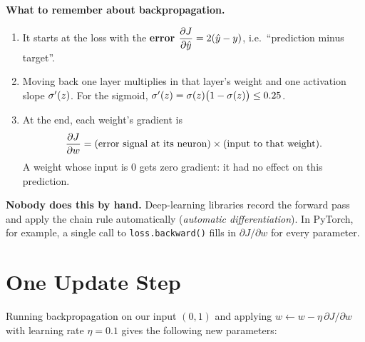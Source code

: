 \documentclass[12pt, a4paper]{article}
\begin{document}
\begin{patternbox}
  \textbf{What to remember about backpropagation.}
  \begin{enumerate}[nosep]
    \item It starts at the loss with the \textbf{error}
          $\dfrac{\partial J}{\partial \hat{y}} = 2(\hat{y} - y)$, i.e.\ ``prediction minus target''.
    \item Moving back one layer multiplies in that layer's weight and one
          activation slope $\sigma'(z)$. For the sigmoid,
          $\sigma'(z) = \sigma(z)\bigl(1-\sigma(z)\bigr) \le 0.25$.
    \item At the end, each weight's gradient is
          \[
            \dfrac{\partial J}{\partial w} = (\text{error signal at its neuron})
            \times (\text{input to that weight}).
          \]
          A weight whose input is $0$ gets zero gradient: it had no effect on
          this prediction.
  \end{enumerate}
\end{patternbox}

\begin{notebox}
  \textbf{Nobody does this by hand.} Deep-learning libraries record the
  forward pass and apply the chain rule automatically
  (\emph{automatic differentiation}). In PyTorch, for example, a single
  call to \texttt{loss.backward()} fills in $\partial J/\partial w$ for
  every parameter.
\end{notebox}

\section{One Update Step}

Running backpropagation on our input $(0, 1)$ and applying
$w \leftarrow w - \eta\,\partial J/\partial w$ with learning rate
$\eta = 0.1$ gives the following new parameters:
\end{document}
